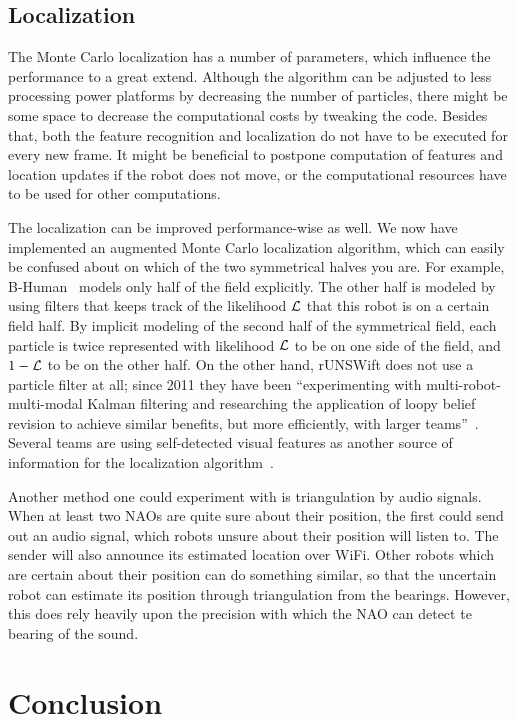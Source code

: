 \documentclass[	DIV=calc,%
							paper=a4,%
							fontsize=9pt,%
							twocolumn]{scrartcl}	 					%
\begin{document}
\subsection{Localization}
The Monte Carlo localization has a number of parameters, which influence the performance to a great extend.
Although the algorithm can be adjusted to less processing power platforms by decreasing the number of particles, there might be some space to decrease the computational costs by tweaking the code.
Besides that, both the feature recognition and localization do not have to be executed for every new frame. It might be beneficial to postpone computation of features and location updates if the robot does not move, or the computational resources have to be used for other computations.

The localization can be improved performance-wise as well.  We now have implemented an augmented Monte Carlo localization algorithm, which can easily be confused about on which of the two symmetrical halves you are.  For example, B-Human~\cite{TeamReportB-Human} models only half of the field explicitly.  The other half is modeled by using filters that keeps track of the likelihood ${\cal L}$ that this robot is on a certain field half.  By implicit modeling of the second half of the symmetrical field, each particle is twice represented with likelihood ${\cal L}$ to be on one side of the field, and $1 - {\cal L}$ to be on the other half.  On the other hand, rUNSWift does not use a particle filter at all; since 2011 they have been ``experimenting with multi-robot-multi-modal Kalman filtering and researching the application of loopy belief revision to achieve similar benefits, but more efficiently, with larger teams''~\cite{rUNSWift-TD-11}.  Several teams are using self-detected visual features as another source of information for the localization algorithm~\cite{sturm2006msc,Cuauhpipiltin-TD12}.

Another method one could experiment with is triangulation by audio signals.  When at least two NAOs are quite sure about their position, the first could send out an audio signal, which robots unsure about their position will listen to.  The sender will also announce its estimated location over WiFi. Other robots which are certain about their position can do something similar, so that the uncertain robot can estimate its position through triangulation from the bearings.  However, this does rely heavily upon the precision with which the NAO can detect te bearing of the sound.


\section{Conclusion}
\label{sec:Conclusion}


\printbibliography
\end{document}
